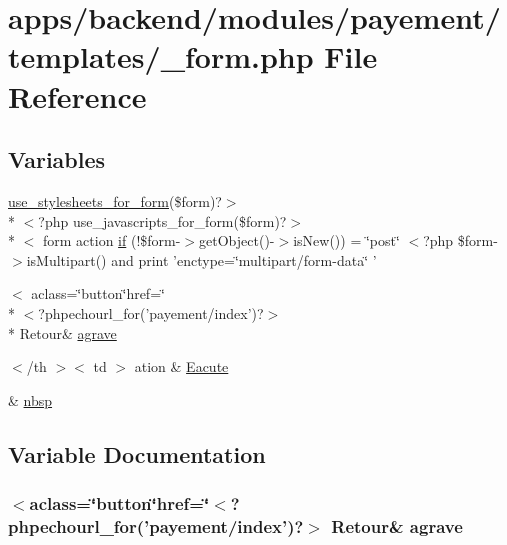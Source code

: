 \hypertarget{backend_2modules_2payement_2templates_2__form_8php}{\section{apps/backend/modules/payement/templates/\-\_\-form.php File Reference}
\label{backend_2modules_2payement_2templates_2__form_8php}
}
\subsection*{Variables}
\begin{DoxyCompactItemize}
\item 
\hyperlink{live_2modules_2user_2templates_2__form_8php_a86bc4522fdbe625b07bc4a4d6eec3df7}{use\-\_\-stylesheets\-\_\-for\-\_\-form}(\$form)?$>$\\*
$<$?php use\-\_\-javascripts\-\_\-for\-\_\-form(\$form)?$>$\\*
$<$ form action \hyperlink{backend_2modules_2payement_2templates_2__form_8php_abd1acf0179bbb4a56e04d4fccdbc121f}{if} (!\$form-\/$>$get\-Object()-\/$>$is\-New()) = \char`\"{}post\char`\"{} $<$?php \$form-\/$>$is\-Multipart() and print 'enctype=\char`\"{}multipart/form-\/data\char`\"{} '
\item 
$<$ aclass=\char`\"{}button\char`\"{}href=\char`\"{}\\*
$<$?phpechourl\-\_\-for('payement/index')?$>$\\*
 Retour\& \hyperlink{backend_2modules_2payement_2templates_2__form_8php_a7665b7c96f8c7b45720dbe22509549f6}{agrave}
\item 
$<$/th $>$$<$ td $>$ ation \& \hyperlink{backend_2modules_2payement_2templates_2__form_8php_a17e5da5dd0bc4295da0347468aaf63f1}{Eacute}
\item 
\& \hyperlink{backend_2modules_2payement_2templates_2__form_8php_aef915316f784c9063d942974538301a6}{nbsp}
\end{DoxyCompactItemize}


\subsection{Variable Documentation}
\hypertarget{backend_2modules_2payement_2templates_2__form_8php_a7665b7c96f8c7b45720dbe22509549f6}{
\subsubsection[{agrave}]{\setlength{\rightskip}{0pt plus 5cm}$<$aclass=\char`\"{}button\char`\"{}href=\char`\"{}$<$?phpechourl\-\_\-for('payement/index')?$>$ Retour\& agrave}}\label{backend_2modules_2payement_2templates_2__form_8php_a7665b7c96f8c7b45720dbe22509549f6}


